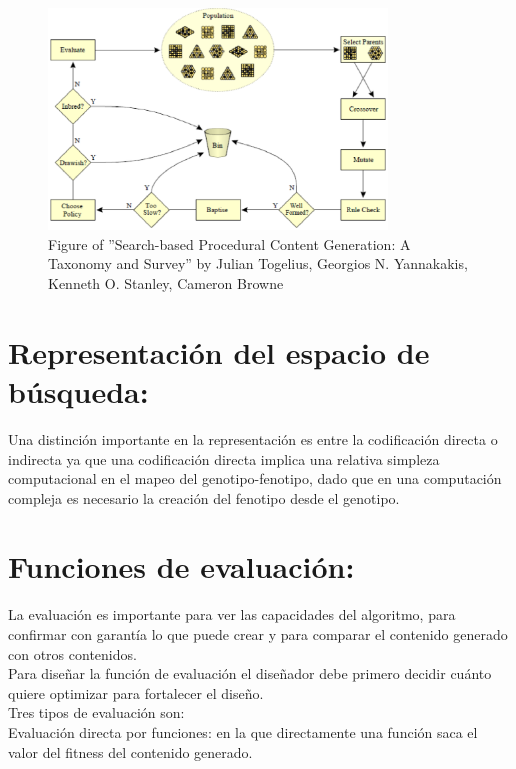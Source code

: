 \begin{figure}[hpb]

	\centering
	\includegraphics[width=9cm]{./eps/fig2.eps}
	\caption{Figure of ''Search-based Procedural Content Generation:
	A Taxonomy and Survey'' by
	Julian Togelius, Georgios N. Yannakakis, Kenneth O. Stanley, Cameron Browne}
	\label{Figura2}

\end{figure}

\section{Representación del espacio de búsqueda:}

Una distinción importante en la representación es entre la codificación directa o indirecta ya que una codificación directa implica una relativa simpleza computacional en el mapeo del genotipo-fenotipo, dado que en una computación compleja es necesario la creación del fenotipo desde el genotipo.\\


\section{Funciones de evaluación:}	

La evaluación es importante para ver las capacidades del algoritmo, para confirmar con garantía lo que puede crear y para comparar el contenido generado con otros contenidos.\\


Para diseñar la función de evaluación el diseñador debe primero decidir cuánto quiere optimizar para fortalecer el diseño.\\


Tres tipos de evaluación son:\\

Evaluación directa por funciones: en la que directamente una función saca el valor del fitness del contenido generado.\\

